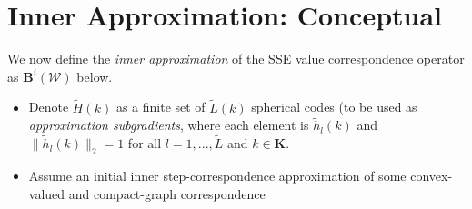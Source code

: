 \documentclass[a4paper,10pt,english]{sphinxmanual}
\begin{document}
\section{Inner Approximation: Conceptual}
\label{payoff_compute:inner-approximation-conceptual}
We now define the \emph{inner approximation} of the SSE value correspondence operator as \(\mathbf{B}^i(\mathcal{W})\) below.
\begin{itemize}
\item {} 
Denote \(\tilde{H}(k)\) as a finite set of \(\tilde{L}(k)\) spherical codes (to be used as \emph{approximation subgradients}, where each
element is \(\tilde{h}_l (k)\) and \(\| \tilde{h}_l (k) \|_2 = 1\) for all
\(l = 1,...,\tilde{L}\) and \(k \in \mathbf{K}\).

\item {} 
Assume an initial inner step-correspondence approximation of some
convex-valued and compact-graph correspondence

\end{itemize}
\end{document}

